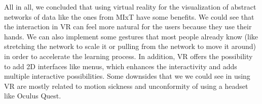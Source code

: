 All in all, we concluded that using virtual reality for the visualization of abstract networks of data like the ones from MIxT have some benefits. We could see that the interaction in VR can feel more natural for the users because they use their hands. We can also implement some gestures that most people already know (like stretching the network to scale it or pulling from the network to move it around) in order to accelerate the learning process. In addition, VR offers the possibility to add 2D interfaces like menus, which enhances the interactivity and adds multiple interactive possibilities. Some downsides that we we could see in using VR are mostly related to motion sickness and unconformity of using a headset like Oculus Quest.

